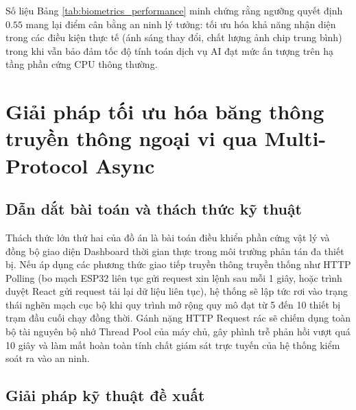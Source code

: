 \documentclass[../DoAn.tex]{subfiles}
\begin{document}
Số liệu Bảng \ref{tab:biometrics_performance} minh chứng rằng ngưỡng quyết định $0.55$ mang lại điểm cân bằng an ninh lý tưởng: tối ưu hóa khả năng nhận diện trong các điều kiện thực tế (ánh sáng thay đổi, chất lượng ảnh chip trung bình) trong khi vẫn bảo đảm tốc độ tính toán dịch vụ AI đạt mức ấn tượng trên hạ tầng phần cứng CPU thông thường.

\section{Giải pháp tối ưu hóa băng thông truyền thông ngoại vi qua Multi-Protocol Async}
\label{section:5.2}

\subsection{Dẫn dắt bài toán và thách thức kỹ thuật}

Thách thức lớn thứ hai của đồ án là bài toán điều khiển phần cứng vật lý và đồng bộ giao diện Dashboard thời gian thực trong môi trường phân tán đa thiết bị. Nếu áp dụng các phương thức giao tiếp truyền thông truyền thống như HTTP Polling (bo mạch ESP32 liên tục gửi request xin lệnh sau mỗi 1 giây, hoặc trình duyệt React gửi request tải lại dữ liệu liên tục), hệ thống sẽ lập tức rơi vào trạng thái nghẽn mạch cục bộ khi quy trình mở rộng quy mô đạt từ 5 đến 10 thiết bị trạm đầu cuối chạy đồng thời. Gánh nặng HTTP Request rác sẽ chiếm dụng toàn bộ tài nguyên bộ nhớ Thread Pool của máy chủ, gây phình trễ phản hồi vượt quá 10 giây và làm mất hoàn toàn tính chất giám sát trực tuyến của hệ thống kiểm soát ra vào an ninh.

\subsection{Giải pháp kỹ thuật đề xuất}
\end{document}
